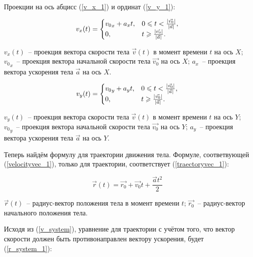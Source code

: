 Проекции на ось абцисс (\ref{v_x_1}) и ординат (\ref{v_y_1}):

\begin{equation}\label{v_x_1}
  v_x(t) =
  \begin{cases}
    {v_0}_x + a_x t, & 0 \leqslant t < \frac{\left|\vec{v_0}\right|}{\left|\vec{a}\right|}, \\
    0,               & t \geqslant \frac{\left|\vec{v_0}\right|}{\left|\vec{a}\right|}.
  \end{cases}
\end{equation}
\begin{Underequation}
  \(v_x(t)\)~-- проекция вектора скорости тела \(\vec{v}(t)\) в момент времени \(t\) на ось \(X\); 
  \({v_0}_x\)~-- проекция вектора начальной скорости тела \(\vec{v_0}\) на ось \(X\); 
  \(a_x\)~-- проекция вектора ускорения тела \(\vec{a}\) на ось \(X\). 
\end{Underequation}

\begin{equation}\label{v_y_1}
  v_y(t) =
  \begin{cases}
    {v_0}_y + a_y t, & 0  \leqslant t < \frac{\left|\vec{v_0}\right|}{\left|\vec{a}\right|}, \\
    0,               & t \geqslant \frac{\left|\vec{v_0}\right|}{\left|\vec{a}\right|}.
  \end{cases}
\end{equation}
\begin{Underequation}
  \(v_y(t)\)~-- проекция вектора скорости тела \(\vec{v}(t)\) в момент времени \(t\) на ось \(Y\); 
  \({v_0}_y\)~-- проекция вектора начальной скорости тела \(\vec{v_0}\) на ось \(Y\); 
  \(a_y\)~-- проекция вектора ускорения тела \(\vec{a}\) на ось \(Y\). 
\end{Underequation}

Теперь найдём формулу для траектории движения тела. Формуле, соответвующей (\ref{velocityvec_1}),
только для траектории, соответствует (\ref{traectoryvec_1}):

\begin{equation}\label{traectoryvec_1}
  \vec{r}(t) = \vec{r_0} + \vec{v_0}t + \frac{\vec{a}t^2}{2}
\end{equation}
\begin{Underequation}
  \(\vec{r}(t)\)~-- радиус-вектор положения тела в момент времени \(t\); 
  \(\vec{r_0}\)~-- радиус-вектор начального положения тела.
\end{Underequation}

Исходя из (\ref{v_system}), уравнение для траектории с учётом того, что вектор скорости должен быть
противонаправлен вектору ускорения, будет (\ref{r_system_1}):


